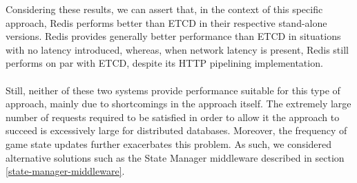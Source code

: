 Considering these results, we can assert that, in the context of this specific approach, Redis performs better than ETCD in their respective stand-alone versions. Redis provides generally better performance than ETCD in situations with no latency introduced, whereas, when network latency is present, Redis still performs on par with ETCD, despite its HTTP pipelining implementation. \\ \\
Still, neither of these two systems provide performance suitable for this type of approach, mainly due to shortcomings in the approach itself. The extremely large number of requests required to be satisfied in order to allow it the approach to succeed is excessively large for distributed databases. Moreover, the frequency of game state updates further exacerbates this problem. As such, we considered alternative solutions such as the State Manager middleware described in section \ref{state-manager-middleware}. 

